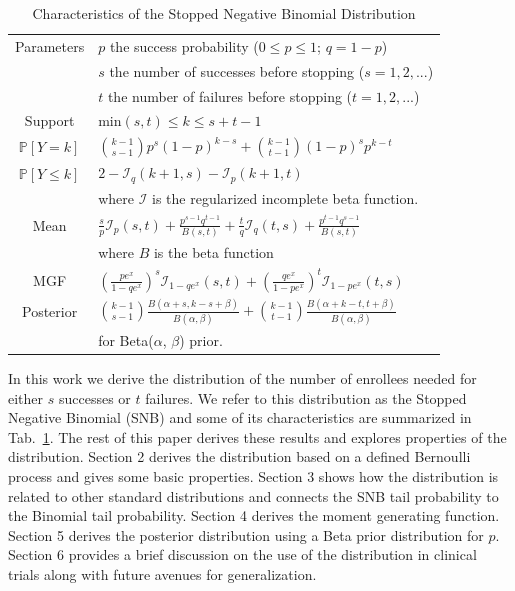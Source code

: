\documentclass[review]{elsarticle}
\begin{document}
\begin{table}[t!]
\caption{Characteristics of the Stopped Negative Binomial Distribution}
\label{tab:snb}
\begin{center}
\begin{tabular}{|c|l|} \hline
Parameters & $p$ the success probability ($0\leq p \leq 1$; $q = 1-p$) \\
           & $s$ the number of successes before stopping ($s=1, 2, ...$)\\
           & $t$ the number of failures before stopping ($t=1, 2, ...$)\\ \hline
Support & min$(s,t) \leq k \leq s+t-1$  \\ \hline
$\mathbb{P}[Y=k]$ & ${k-1 \choose s-1} p^s (1-p)^{k-s} + {k-1 \choose t-1} (1-p)^s p^{k-t}$\\ \hline
$\mathbb{P}[Y \leq k]$ & $2 - \mathcal{I}_{q}(k+1, s) - \mathcal{I}_{p}(k+1, t)$\\ 
    & where $\mathcal{I}$ is the regularized incomplete beta function.\\ \hline
Mean & $\frac{s}{p} \mathcal{I}_p(s,t) + \frac{p^{s-1} q^{t-1}}{B(s,t)} +
  \frac{t}{q} \mathcal{I}_q(t,s) + \frac{p^{t-1} q^{s-1}}{B(s,t)}$\\ 
  & where $B$ is the beta function \\ \hline
MGF & $\left(\frac{p e^x}{1 - qe^x}\right)^s 
  \mathcal{I}_{1-qe^x} (s, t) + \left(\frac{qe^x}{1-pe^x}\right)^t 
  \mathcal{I}_{1-pe^x}(t, s) $\\ \hline
Posterior & 
${k-1 \choose s-1} \frac{B\left(\alpha+s, k-s+\beta \right)}{B(\alpha, \beta)}+
{k-1 \choose t-1} \frac{B\left(\alpha + k-t, t+\beta\right)}{B(\alpha,\beta)}$\\
& for Beta($\alpha$, $\beta$) prior. \\ \hline
\end{tabular}
\end{center}
\end{table}

In this work we derive the distribution of the number of enrollees needed
for either $s$ successes or $t$ failures. We refer to this distribution
as the Stopped Negative Binomial (SNB) and some of its characteristics are
summarized in Tab.~\ref{tab:snb}.
The rest of this paper derives these results
and explores properties of the distribution.
Section 2 derives the distribution
based on a defined Bernoulli process and gives some basic properties.
Section 3 shows how the distribution is related to other standard
distributions and connects the SNB tail probability to the Binomial tail 
probability.
Section 4 derives the moment generating function.
Section 5 derives the posterior distribution using a Beta prior distribution
for $p$. Section 6 provides a brief discussion on the use of the distribution
in clinical trials along with future avenues for generalization.
\end{document}
